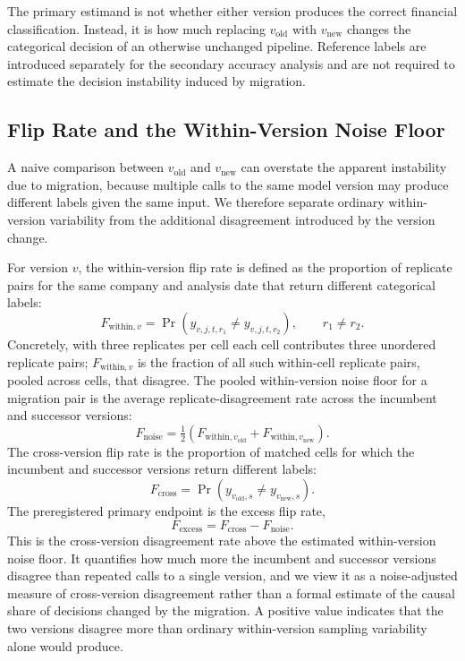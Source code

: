 \documentclass[11pt]{article}
\begin{document}
The primary estimand is not whether either version produces the correct financial classification. Instead, it is how much replacing $v_{\mathrm{old}}$ with $v_{\mathrm{new}}$ changes the categorical decision of an otherwise unchanged pipeline. Reference labels are introduced separately for the secondary accuracy analysis and are not required to estimate the decision instability induced by migration.

\subsection{Flip Rate and the Within-Version Noise Floor}
\label{subsec:noisefloor}
A naive comparison between $v_{\mathrm{old}}$ and $v_{\mathrm{new}}$ can overstate the apparent instability due to migration, because multiple calls to the same model version may produce different labels given the same input. We therefore separate ordinary within-version variability from the additional disagreement introduced by the version change.

For version $v$, the within-version flip rate is defined as the proportion of replicate pairs for the same company and analysis date that return different categorical labels:
\begin{equation}
F_{\mathrm{within},v} = \Pr\!\left( y_{v,j,t,r_1}\neq y_{v,j,t,r_2} \right), \qquad r_1\neq r_2.
\end{equation}
Concretely, with three replicates per cell each cell contributes three unordered replicate pairs; $F_{\mathrm{within},v}$ is the fraction of all such within-cell replicate pairs, pooled across cells, that disagree. The pooled within-version noise floor for a migration pair is the average replicate-disagreement rate across the incumbent and successor versions:
\begin{equation}
F_{\mathrm{noise}} = \tfrac{1}{2} \left( F_{\mathrm{within},v_{\mathrm{old}}} + F_{\mathrm{within},v_{\mathrm{new}}} \right).
\end{equation}
The cross-version flip rate is the proportion of matched cells for which the incumbent and successor versions return different labels:
\begin{equation}
F_{\mathrm{cross}} = \Pr\!\left( y_{v_{\mathrm{old}},s} \neq y_{v_{\mathrm{new}},s} \right).
\end{equation}
The preregistered primary endpoint is the excess flip rate,
\begin{equation}
F_{\mathrm{excess}} = F_{\mathrm{cross}} - F_{\mathrm{noise}}.
\end{equation}
This is the cross-version disagreement rate above the estimated within-version noise floor. It quantifies how much more the incumbent and successor versions disagree than repeated calls to a single version, and we view it as a noise-adjusted measure of cross-version disagreement rather than a formal estimate of the causal share of decisions changed by the migration. A positive value indicates that the two versions disagree more than ordinary within-version sampling variability alone would produce.
\end{document}
